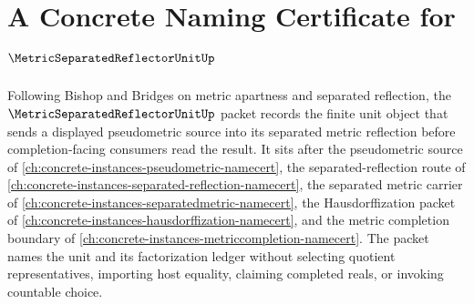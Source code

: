 \chapter{A Concrete Naming Certificate for $\MetricSeparatedReflectorUnitUp$}
\label{ch:concrete-instances-metric-separated-reflector-unit-namecert}

Following Bishop and Bridges on metric apartness and separated reflection, the $\MetricSeparatedReflectorUnitUp$ packet records the finite unit object that sends a displayed pseudometric source into its separated metric reflection before completion-facing consumers read the result. It sits after the pseudometric source of \autoref{ch:concrete-instances-pseudometric-namecert}, the separated-reflection route of \autoref{ch:concrete-instances-separated-reflection-namecert}, the separated metric carrier of \autoref{ch:concrete-instances-separatedmetric-namecert}, the Hausdorffization packet of \autoref{ch:concrete-instances-hausdorffization-namecert}, and the metric completion boundary of \autoref{ch:concrete-instances-metriccompletion-namecert}. The packet names the unit and its factorization ledger without selecting quotient representatives, importing host equality, claiming completed reals, or invoking countable choice.

